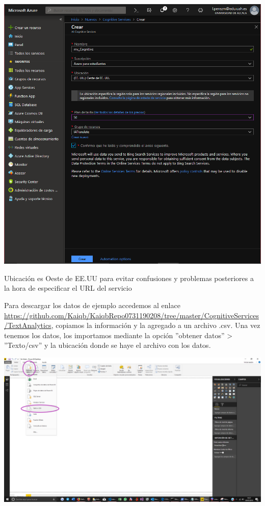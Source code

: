 \documentclass[english,runningheads,a4paper]{llncs}[2018/03/10]
\newenvironment{nscenter}
 {\parskip=0pt\par\nopagebreak\centering}
 {\par\noindent\ignorespacesafterend}
\begin{document}
    \begin{nscenter}
        \centering
        \includegraphics[scale = 0.25]{./IA/AZURE/confCognitive.PNG}
        \caption{Ubicación es Oeste de EE.UU para evitar confusiones y problemas
        posteriores a la hora de especificar el URL del servicio}
    \end{nscenter}
    
    
    Para descargar los datos de ejemplo accedemos al enlace 
    \url{https://github.com/Kaiqb/KaiqbRepo0731190208/tree/master/CognitiveServices/TextAnalytics}, 
    copiamos la información y la agregado a un archivo .csv. Una vez tenemos 
    los datos, los importamos mediante la opción 
    ''obtener datos'' > ''Texto/csv'' y la ubicación donde se haye el archivo 
    con los datos.
    
    \begin{nscenter}  
        \includegraphics[scale=0.25]{./IA/AZURE/loadData.png}
    \end{nscenter}
    
\end{document}
